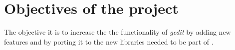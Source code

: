 
\chapter{Objectives of the project}


The objective it is to increase the the functionality of \emph{gedit} by adding new features and by porting it to the new libraries needed to be part of \emph{}.



